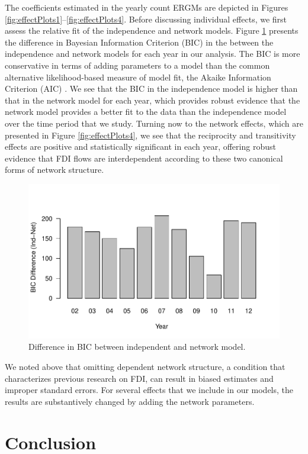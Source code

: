 \documentclass{article}
\begin{document}
The coefficients estimated in the yearly count ERGMs are depicted in Figures \ref{fig:effectPlots1}--\ref{fig:effectPlots4}. Before discussing individual effects, we first assess the relative fit of the independence and network models. Figure \ref{fig:bic} presents the difference in Bayesian Information Criterion (BIC) in the between the independence and network models for each year in our analysis. The BIC is more conservative in terms of adding parameters to a model than the common alternative likelihood-based measure of model fit, the Akaike Information Criterion (AIC) \citep{waldorp2005model,abrahamowicz1990optimal,raftery1999bayes}. We see that the BIC in the independence model is higher than that in the network model for each year, which provides robust evidence that the network model provides a better fit to the data than the independence model over the time period that we study. Turning now to the network effects, which are presented in Figure \ref{fig:effectPlots4}, we see that the reciprocity and transitivity effects are positive and statistically significant in each year, offering robust evidence that FDI flows are interdependent according to these two canonical forms of network structure.

\begin{figure}
\centering
\includegraphics[scale=.75]{draft_figures/BICdiff.pdf} \vspace{-.5cm}
\caption{\label{fig:bic} Difference in BIC between independent and network model.}
\end{figure}

We noted above that omitting dependent network structure, a condition that characterizes previous research on FDI, can result in biased estimates and improper standard errors. For several effects that we include in our models, the results are substantively changed by adding the network parameters.


\section{Conclusion}


\newpage


\end{document}
